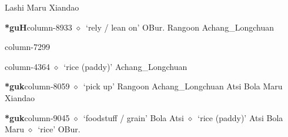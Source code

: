          Lashi 
\hspace{1ex}
         Maru 
\hspace{1ex}
         Xiandao 
  \item {\footnotesize \textbf{*guH}}{\tiny column-8933}
         $\diamond$~`rely / lean on'
         OBur. 
\hspace{1ex}
         Rangoon 
\hspace{1ex}
         Achang\_Longchuan 
  \item {\footnotesize \textbf{}}{\tiny column-7299}
  \item {\footnotesize \textbf{}}{\tiny column-4364}
         $\diamond$~`rice (paddy)'
         Achang\_Longchuan 
  \item {\footnotesize \textbf{*guk}}{\tiny column-8059}
         $\diamond$~`pick up'
         Rangoon 
\hspace{1ex}
         Achang\_Longchuan 
\hspace{1ex}
         Atsi 
\hspace{1ex}
         Bola 
\hspace{1ex}
         Maru 
\hspace{1ex}
         Xiandao 
  \item {\footnotesize \textbf{*guk}}{\tiny column-9045}
         $\diamond$~`foodstuff / grain'
         Bola 
\hspace{1ex}
         Atsi 
\hspace{1ex}
         $\diamond$~`rice (paddy)'
         Atsi 
\hspace{1ex}
         Bola 
\hspace{1ex}
         Maru 
\hspace{1ex}
         $\diamond$~`rice'
         OBur. 
